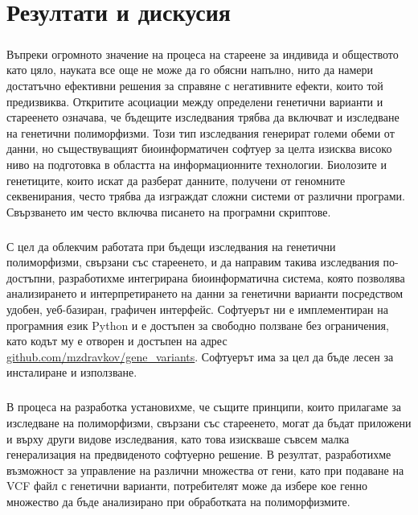 \documentclass[pdftex,cyrillic,14pt,a4page,twoside,openright]{extreport}
\begin{document}
\chapter{Резултати и дискусия}
\paragraph{}
Въпреки огромното значение на процеса на стареене за индивида и обществото като цяло, науката все още не може да го обясни напълно, нито да намери достатъчно ефективни решения за справяне с негативните ефекти, които той предизвиква. Откритите асоциации между определени генетични варианти и стареенето означава, че бъдещите изследвания трябва да включват и изследване на генетични полиморфизми. Този тип изследвания генерират големи обеми от данни, но съществуващият биоинформатичен софтуер за целта изисква високо ниво на подготовка в областта на информационните технологии. Биолозите и генетиците, които искат да разберат данните, получени от геномните секвенирания, често трябва да изграждат сложни системи от различни програми. Свързването им често включва писането на програмни скриптове.

\paragraph{}
С цел да облекчим работата при бъдещи изследвания на генетични полиморфизми, свързани със стареенето, и да направим такива изследвания по-достъпни, разработихме интегрирана биоинформатична система, която позволява анализирането и интерпретирането на данни за генетични варианти посредством удобен, уеб-базиран, графичен интерфейс. Софтуерът ни е имплементиран на програмния език Python и е достъпен за свободно ползване без ограничения, като кодът му е отворен и достъпен на адрес \url{github.com/mzdravkov/gene_variants}. Софтуерът има за цел да бъде лесен за инсталиране и използване.

\paragraph{}
В процеса на разработка установихме, че същите принципи, които прилагаме за изследване на полиморфизми, свързани със стареенето, могат да бъдат приложени и върху други видове изследвания, като това изискваше съвсем малка генерализация на предвиденото софтуерно решение. В резултат, разработихме възможност за управление на различни множества от гени, като при подаване на VCF файл с генетични варианти, потребителят може да избере кое генно множество да бъде анализирано при обработката на полиморфизмите.
\end{document}
